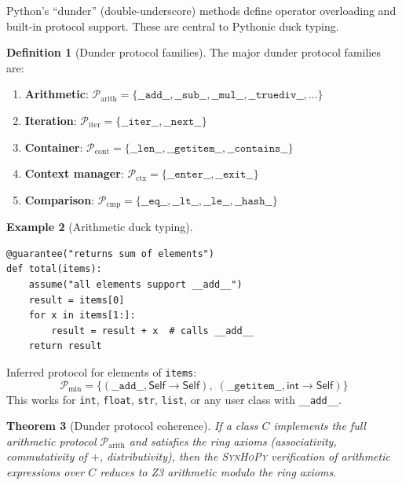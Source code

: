 \documentclass[11pt,a4paper]{report}
\theoremstyle{definition}
\newtheorem{definition}{Definition}[chapter]
\newtheorem{example}[definition]{Example}
\theoremstyle{plain}
\newtheorem{theorem}[definition]{Theorem}
\newcommand{\synhopy}{\textsc{SynHoPy}}
\begin{document}
Python's ``dunder'' (double-underscore) methods define operator overloading and
built-in protocol support. These are central to Pythonic duck typing.

\begin{definition}[Dunder protocol families]
The major dunder protocol families are:
\begin{enumerate}
  \item \textbf{Arithmetic}: $\mathcal{P}_{\mathrm{arith}} = \{
    \mathtt{\_\_add\_\_}, \mathtt{\_\_sub\_\_}, \mathtt{\_\_mul\_\_},
    \mathtt{\_\_truediv\_\_}, \ldots\}$
  \item \textbf{Iteration}: $\mathcal{P}_{\mathrm{iter}} = \{
    \mathtt{\_\_iter\_\_}, \mathtt{\_\_next\_\_}\}$
  \item \textbf{Container}: $\mathcal{P}_{\mathrm{cont}} = \{
    \mathtt{\_\_len\_\_}, \mathtt{\_\_getitem\_\_}, \mathtt{\_\_contains\_\_}\}$
  \item \textbf{Context manager}: $\mathcal{P}_{\mathrm{ctx}} = \{
    \mathtt{\_\_enter\_\_}, \mathtt{\_\_exit\_\_}\}$
  \item \textbf{Comparison}: $\mathcal{P}_{\mathrm{cmp}} = \{
    \mathtt{\_\_eq\_\_}, \mathtt{\_\_lt\_\_}, \mathtt{\_\_le\_\_},
    \mathtt{\_\_hash\_\_}\}$
\end{enumerate}
\end{definition}

\begin{example}[Arithmetic duck typing]
\begin{lstlisting}[style=synhopy]
@guarantee("returns sum of elements")
def total(items):
    assume("all elements support __add__")
    result = items[0]
    for x in items[1:]:
        result = result + x  # calls __add__
    return result
\end{lstlisting}

Inferred protocol for elements of \texttt{items}:
\[
  \mathcal{P}_{\min} = \{
    (\mathtt{\_\_add\_\_}, \mathsf{Self} \to \mathsf{Self}),\;
    (\mathtt{\_\_getitem\_\_}, \mathsf{int} \to \mathsf{Self})
  \}
\]
This works for \texttt{int}, \texttt{float}, \texttt{str}, \texttt{list},
or any user class with \texttt{\_\_add\_\_}.
\end{example}

\begin{theorem}[Dunder protocol coherence]
\label{thm:dunder-coherence}
If a class $C$ implements the full arithmetic protocol $\mathcal{P}_{\mathrm{arith}}$
and satisfies the ring axioms (associativity, commutativity of $+$, distributivity),
then the \synhopy{} verification of arithmetic expressions over $C$ reduces to
Z3 arithmetic modulo the ring axioms.
\end{theorem}
\end{document}
